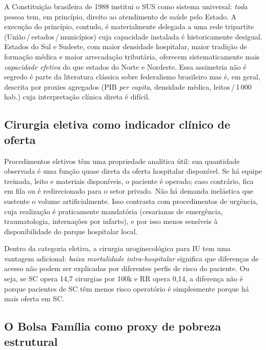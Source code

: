 \documentclass[12pt,a4paper,oneside]{article}
\begin{document}
A Constituição brasileira de 1988 institui o SUS como sistema
universal: \textit{toda} pessoa tem, em princípio, direito ao
atendimento de saúde pelo Estado. A execução do princípio,
contudo, é materialmente delegada a uma rede tripartite
(União\,/\,estados\,/\,municípios) cuja capacidade instalada é
historicamente desigual. Estados do Sul e Sudeste, com maior
densidade hospitalar, maior tradição de formação médica e maior
arrecadação tributária, oferecem sistematicamente mais
\textit{capacidade efetiva} do que estados do Norte e Nordeste.
Essa assimetria não é segredo \textemdash{} é parte da literatura
clássica sobre federalismo brasileiro \textemdash{} mas é, em
geral, descrita por proxies agregados (PIB \textit{per capita},
densidade médica, leitos\,/\,1\,000 hab.) cuja interpretação
clínica direta é difícil.

\subsection{Cirurgia eletiva como indicador clínico de oferta}

Procedimentos eletivos têm uma propriedade analítica útil:
sua quantidade observada é uma função quase direta da oferta
hospitalar disponível. Se há equipe treinada, leito e materiais
disponíveis, o paciente é operado; caso contrário, fica em
fila ou é redirecionado para o setor privado. Não há demanda
inelástica que sustente o volume artificialmente. Isso contrasta
com procedimentos de urgência, cuja realização é praticamente
mandatória (cesarianas de emergência, traumatologia,
internações por infarto), e por isso menos sensíveis à
disponibilidade do parque hospitalar local.

Dentro da categoria eletiva, a cirurgia uroginecológica para IU
tem uma vantagem adicional: \textit{baixa mortalidade
intra-hospitalar} significa que diferenças de acesso não podem
ser explicadas por diferentes perfis de risco do paciente.
Ou seja, se SC opera 14{,}7 cirurgias por 100k e RR opera 0{,}14,
a diferença não é porque pacientes de SC têm menos risco
operatório \textemdash{} é simplesmente porque há mais oferta
em SC.

\subsection{O Bolsa Família como proxy de pobreza estrutural}
\end{document}
